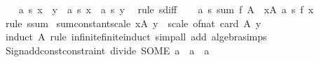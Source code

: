 \begin{isabellebody}
\ \ \isamarkupfalse%
\ {\isachardoublequoteopen}a\ {\isacharasterisk}{\kern0pt}s\ {\isacharparenleft}{\kern0pt}x\ {\isacharminus}{\kern0pt}\ y{\isacharparenright}{\kern0pt}\ {\isacharequal}{\kern0pt}\ a\ {\isacharasterisk}{\kern0pt}s\ x\ {\isacharminus}{\kern0pt}\ a\ {\isacharasterisk}{\kern0pt}s\ y{\isachardoublequoteclose}\ \isamarkupfalse%
\ {\isacharparenleft}{\kern0pt}rule\ s{\isachardot}{\kern0pt}diff{\isacharparenright}{\kern0pt}\isanewline
\ \ \isamarkupfalse%
\ {\isachardoublequoteopen}a\ {\isacharasterisk}{\kern0pt}s\ {\isacharparenleft}{\kern0pt}sum\ f\ A{\isacharparenright}{\kern0pt}\ {\isacharequal}{\kern0pt}\ {\isacharparenleft}{\kern0pt}{\isasymSum}x{\isasymin}A{\isachardot}{\kern0pt}\ a\ {\isacharasterisk}{\kern0pt}s\ {\isacharparenleft}{\kern0pt}f\ x{\isacharparenright}{\kern0pt}{\isacharparenright}{\kern0pt}{\isachardoublequoteclose}\ \isamarkupfalse%
\ {\isacharparenleft}{\kern0pt}rule\ s{\isachardot}{\kern0pt}sum{\isacharparenright}{\kern0pt}\isanewline
{}\isamarkupfalse%
%
\endisatagproof
{\isafoldproof}%
%
\isadelimproof
\isanewline
%
\endisadelimproof
\isanewline
{}\isamarkupfalse%
\ sum{\isacharunderscore}{\kern0pt}constant{\isacharunderscore}{\kern0pt}scale{\isacharcolon}{\kern0pt}\ {\isachardoublequoteopen}{\isacharparenleft}{\kern0pt}{\isasymSum}x{\isasymin}A{\isachardot}{\kern0pt}\ y{\isacharparenright}{\kern0pt}\ {\isacharequal}{\kern0pt}\ scale\ {\isacharparenleft}{\kern0pt}of{\isacharunderscore}{\kern0pt}nat\ {\isacharparenleft}{\kern0pt}card\ A{\isacharparenright}{\kern0pt}{\isacharparenright}{\kern0pt}\ y{\isachardoublequoteclose}\isanewline
%
\isadelimproof
\ \ %
\endisadelimproof
%
\isatagproof
{}\isamarkupfalse%
\ {\isacharparenleft}{\kern0pt}induct\ A\ rule{\isacharcolon}{\kern0pt}\ infinite{\isacharunderscore}{\kern0pt}finite{\isacharunderscore}{\kern0pt}induct{\isacharparenright}{\kern0pt}\ {\isacharparenleft}{\kern0pt}simp{\isacharunderscore}{\kern0pt}all\ add{\isacharcolon}{\kern0pt}\ algebra{\isacharunderscore}{\kern0pt}simps{\isacharparenright}{\kern0pt}%
\endisatagproof
{\isafoldproof}%
%
\isadelimproof
\isanewline
%
\endisadelimproof
\isanewline
{}\isamarkupfalse%
\isanewline
%
\isadelimML
\isanewline
%
\endisadelimML
%
\isatagML
{}\isamarkupfalse%
\ {\isacartoucheopen}Sign{\isachardot}{\kern0pt}add{\isacharunderscore}{\kern0pt}const{\isacharunderscore}{\kern0pt}constraint\ {\isacharparenleft}{\kern0pt}\isactrlconstUNDERSCOREname {\isasymopen}divide{\isasymclose}{\isacharcomma}{\kern0pt}\ SOME\ \isactrltyp {\isasymopen}{\isacharprime}{\kern0pt}a\ {\isasymRightarrow}\ {\isacharprime}{\kern0pt}a\ {\isasymRightarrow}\ {\isacharprime}{\kern0pt}a{\isasymclose}{\isacharparenright}{\kern0pt}{\isacartoucheclose}%

\end{isabellebody}
